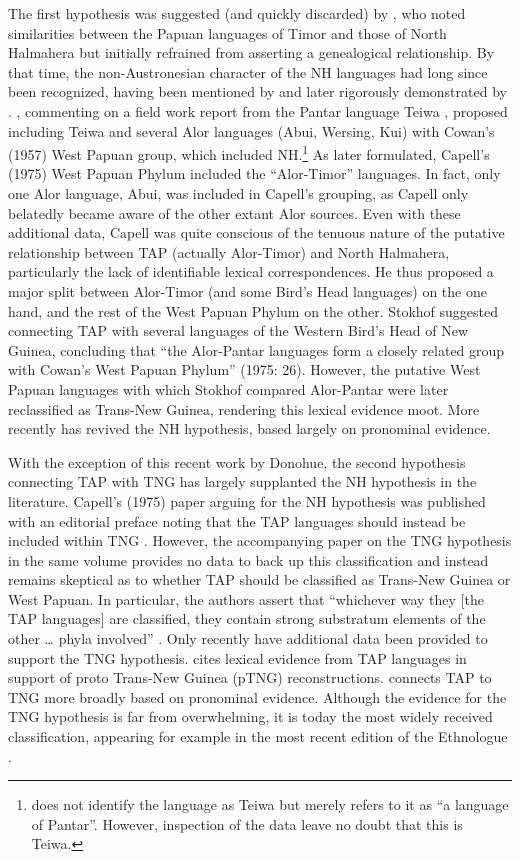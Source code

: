 The first hypothesis was suggested (and quickly discarded) by \citet{Capell1944}, who noted similarities between the Papuan languages of Timor and those of North Halmahera but initially refrained from asserting a genealogical relationship. By that time, the non-Austronesian character of the NH languages had long since been recognized, having been mentioned by \citet{VanDerAaEtAl1872} and later rigorously demonstrated by \citet{VanDerVeen1915}. \citet{Anceaux1973}, commenting on a field work report from the Pantar language Teiwa \citep{Watuseke1973}, proposed including Teiwa and several Alor languages (Abui, Wersing, Kui) with Cowan's (1957) West Papuan group, which included NH.\nocite{Cowen1957}\footnote{\citet{Watuseke1973} does not identify the language as Teiwa but merely refers to it as ``a language of Pantar''. However, inspection of the data leave no doubt that this is Teiwa.} As later formulated, Capell's (1975) West Papuan Phylum included the ``Alor-Timor'' languages. \nocite{Capell1975} In fact,
only one Alor language, Abui, was included in Capell's grouping, as Capell only belatedly became aware of the other extant Alor sources. Even with these additional data, Capell was quite conscious of the tenuous nature of the putative relationship between TAP (actually Alor-Timor) and North Halmahera, particularly the lack of identifiable lexical correspondences. He thus proposed a major split between Alor-Timor (and some Bird's Head languages) on the one hand, and the rest of the West Papuan Phylum on the other. Stokhof suggested connecting TAP with several languages of the Western Bird's Head of New Guinea, concluding that ``the Alor-Pantar languages form a closely related group with Cowan's West Papuan Phylum'' (1975: 26). However, the putative West Papuan languages with which Stokhof compared Alor-Pantar were later reclassified as Trans-New Guinea, rendering this lexical evidence moot. More recently \citet{Donohue2008} has revived the NH hypothesis, based largely on pronominal evidence.

With the exception of this recent work by Donohue, the second hypothesis connecting TAP with TNG has largely supplanted the NH hypothesis in the literature. Capell's (1975) paper arguing for the NH hypothesis was published with an editorial preface noting that the TAP languages should instead be included within TNG \citep[667]{Wurm1975}. However, the accompanying paper on the TNG hypothesis in the same volume provides no data to back up this classification and instead remains skeptical as to whether TAP should be classified as Trans-New Guinea or West Papuan. In particular, the authors assert that ``whichever way they [the TAP languages] are classified, they contain strong substratum elements of the other {\dots} phyla involved'' \citep[318]{WurmEtAl1975}. Only recently have additional data been provided to support the TNG hypothesis. \citet{Pawley2001} cites lexical evidence from TAP languages in support of proto Trans-New Guinea (pTNG) reconstructions. \citet{Ross2005} connects TAP to TNG more broadly based
on pronominal evidence. Although the evidence for the TNG hypothesis is far from overwhelming, it is today the most widely received classification, appearing for example in the most recent edition of the Ethnologue \citep{LewisEtAl2013}.

